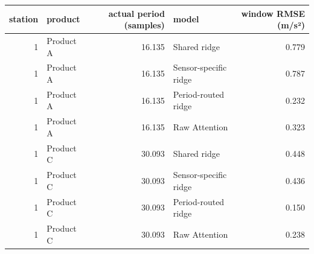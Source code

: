 \begin{tabular}{rlrlr}
\toprule
station & product & actual period (samples) & model & window RMSE (m/s²) \\
\midrule
1 & Product A & 16.135 & Shared ridge & 0.779 \\
1 & Product A & 16.135 & Sensor-specific ridge & 0.787 \\
1 & Product A & 16.135 & Period-routed ridge & 0.232 \\
1 & Product A & 16.135 & Raw Attention & 0.323 \\
1 & Product C & 30.093 & Shared ridge & 0.448 \\
1 & Product C & 30.093 & Sensor-specific ridge & 0.436 \\
1 & Product C & 30.093 & Period-routed ridge & 0.150 \\
1 & Product C & 30.093 & Raw Attention & 0.238 \\
\bottomrule
\end{tabular}
